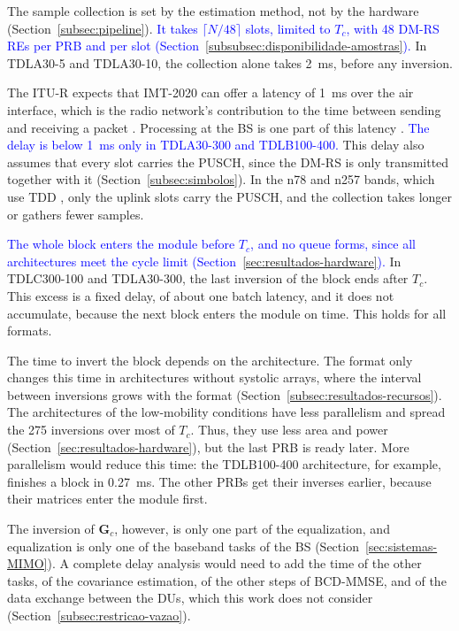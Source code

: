 The sample collection is set by the estimation method, not by the hardware (Section~\ref{subsec:pipeline}). \textcolor{blue}{It takes $\lceil N/48 \rceil$ slots, limited to $T_c$, with 48 DM-RS REs per PRB and per slot (Section~\ref{subsubsec:disponibilidade-amostras}).} In TDLA30-5 and TDLA30-10, the collection alone takes 2~ms, before any inversion.

The ITU-R expects that IMT-2020 can offer a latency of 1~ms over the air interface, which is the radio network's contribution to the time between sending and receiving a packet \cite[pp.~13--14]{itu-m2083}. Processing at the BS is one part of this latency \cite[Sec.~7.2.6 and Tab.~3]{itu-m2412}. \textcolor{blue}{The delay is below 1~ms only in TDLA30-300 and TDLB100-400.} This delay also assumes that every slot carries the PUSCH, since the DM-RS is only transmitted together with it (Section~\ref{subsec:simbolos}). In the n78 and n257 bands, which use TDD \cite[Tabs.~5.2-1 and 5.2-2]{3gpp-ts38104}, only the uplink slots carry the PUSCH, and the collection takes longer or gathers fewer samples.

\textcolor{blue}{The whole block enters the module before $T_c$, and no queue forms, since all architectures meet the cycle limit (Section~\ref{sec:resultados-hardware}).} In TDLC300-100 and TDLA30-300, the last inversion of the block ends after $T_c$. This excess is a fixed delay, of about one batch latency, and it does not accumulate, because the next block enters the module on time. This holds for all formats.

The time to invert the block depends on the architecture. The format only changes this time in architectures without systolic arrays, where the interval between inversions grows with the format (Section~\ref{subsec:resultados-recursos}). The architectures of the low-mobility conditions have less parallelism and spread the 275 inversions over most of $T_c$. Thus, they use less area and power (Section~\ref{sec:resultados-hardware}), but the last PRB is ready later. More parallelism would reduce this time: the TDLB100-400 architecture, for example, finishes a block in 0.27~ms. The other PRBs get their inverses earlier, because their matrices enter the module first.

The inversion of $\mathbf G_c$, however, is only one part of the equalization, and equalization is only one of the baseband tasks of the BS (Section~\ref{sec:sistemas-MIMO}). A complete delay analysis would need to add the time of the other tasks, of the covariance estimation, of the other steps of BCD-MMSE, and of the data exchange between the DUs, which this work does not consider (Section~\ref{subsec:restricao-vazao}).
